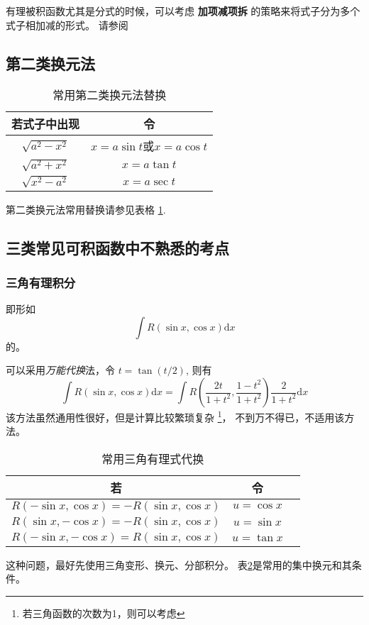 \documentclass{beaulivre}
\begin{document}
有理被积函数尤其是分式的时候，可以考虑 \textbf{加项减项拆}
的策略来将式子分为多个式子相加减的形式。
请参阅\cite[page 98, pdf 109, example 7]{we}

\subsection{第二类换元法}

\begin{table}
    \centering
    \begin{tabular}{cc}
        \toprule
        若式子中出现 & 令 \\
        \midrule
        $\sqrt{a^2 - x^2}$ & $x = a \sin t$或$x = a \cos t$ \\
        $\sqrt{a^2 + x^2}$ & $x = a \tan t$ \\
        $\sqrt{x^2 - a^2}$ & $x = a \sec t$ \\
        \bottomrule
    \end{tabular}
    \caption{常用第二类换元法替换}
    \label{tab:useful-sec-type-substitutions}
\end{table}
第二类换元法常用替换请参见表格 \ref{tab:useful-sec-type-substitutions}.

\subsection{三类常见可积函数中不熟悉的考点}

\subsubsection{三角有理积分}

即形如
\[
    \int R(\sin x, \cos x) \mbox{d} x 
\]
的。

可以采用\textit{万能代换}法，令 $t = \tan (t/2)$, 则有
\begin{equation}
    \int R(\sin x, \cos x) \mbox{d} x 
    = \int R\left(\dfrac{2t}{1+t^2}, \dfrac{1-t^2}{1+t^2}\right) 
    \dfrac{2}{1+t^2} \mbox{d} x
\end{equation}
该方法虽然通用性很好，但是计算比较繁琐复杂
\footnote{若三角函数的次数为1，则可以考虑}，
不到万不得已，不适用该方法。

\begin{table}
    \centering
    \begin{tabular}{ccc}
        \toprule
        若 & 令 \\
        \midrule
        $R(- \sin x,   \cos x) = -R(\sin x, \cos x)$ & $u = \cos x$ \\
        $R(  \sin x, - \cos x) = -R(\sin x, \cos x)$ & $u = \sin x$ \\
        $R(- \sin x, - \cos x) =  R(\sin x, \cos x)$ & $u = \tan x$ \\
        \bottomrule
    \end{tabular}
    \caption{常用三角有理式代换}
    \label{tab:useful-tri-rational-substitutions}
\end{table}
这种问题，最好先使用三角变形、换元、分部积分。
表\ref{tab:useful-tri-rational-substitutions}是常用的集中换元和其条件。
\end{document}
